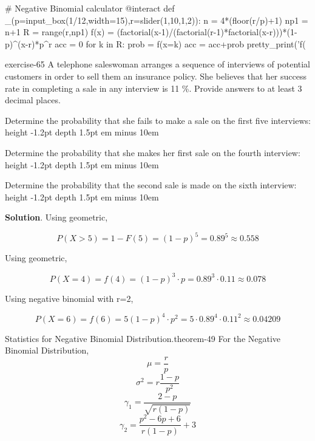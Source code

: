 \documentclass[10pt,]{book}
\newcommand{\fillin}[1]{\leavevmode\leaders\vrule height -1.2pt depth 1.5pt \hskip #1em minus #1em \null}
\numberwithin{equation}{section}
\newcommand{\gt}{>}
\begin{document}
\begin{sageinput}
# Negative Binomial calculator
@interact
def _(p=input_box(1/12,width=15),r=slider(1,10,1,2)):
    n = 4*(floor(r/p)+1)
    np1 = n+1
    R = range(r,np1)
    f(x) = (factorial(x-1)/(factorial(r-1)*factorial(x-r)))*(1-p)^(x-r)*p^r
    acc = 0
    for k in R:
        prob = f(x=k)
        acc = acc+prob
        pretty_print('f(%
\end{sageinput}
%
\begin{inlineexercise}{}{exercise-65}%
\hypertarget{p-993}{}%
A telephone saleswoman arranges a sequence of interviews of potential customers in order to sell them an insurance policy. She believes that her success rate in completing a sale in any interview is 11 \%. Provide answers to at least 3 decimal places.%
\par
\hypertarget{p-994}{}%
Determine the probability that she fails to make a sale on the first five interviews:   \fillin{10}%
\par
\hypertarget{p-995}{}%
Determine the probability that she makes her first sale on the fourth interview:  \fillin{10}%
\par
\hypertarget{p-996}{}%
Determine the probability that the second sale is made on the sixth interview:  \fillin{10}%
\par\smallskip%
\noindent\textbf{Solution}.\hypertarget{solution-29}{}\quad%
\hypertarget{p-997}{}%
Using geometric,%
\par
\hypertarget{p-998}{}%
%
\begin{equation*}
P(X \gt 5) = 1 - F(5) = (1-p)^5 = 0.89^5 \approx 0.558
\end{equation*}
%
\par
\hypertarget{p-999}{}%
Using geometric,%
\par
\hypertarget{p-1000}{}%
%
\begin{equation*}
P(X = 4) = f(4) = (1-p)^3 \cdot p = 0.89^3 \cdot 0.11 \approx 0.078
\end{equation*}
%
\par
\hypertarget{p-1001}{}%
Using negative binomial with r=2,%
\par
\hypertarget{p-1002}{}%
%
\begin{equation*}
P(X = 6) = f(6) = 5 (1-p)^4 \cdot p^2 = 5 \cdot 0.89^4 \cdot 0.11^2 \approx 0.04209
\end{equation*}
%
\end{inlineexercise}
\hypertarget{p-1003}{}%
\begin{theorem}{Statistics for Negative Binomial Distribution.}{}{theorem-49}%
\hypertarget{NegativeBinomialStatistics}{}%
For the Negative Binomial Distribution,%
\begin{equation*}
\mu = \frac{r}{p}
\end{equation*}
%
\begin{equation*}
\sigma^2 = r \frac{1-p}{p^2}
\end{equation*}
%
\begin{equation*}
\gamma_1 = \frac{2-p}{\sqrt{r(1-p)}}
\end{equation*}
%
\begin{equation*}
\gamma_2 = \frac{p^2-6p+6}{r(1-p)} + 3
\end{equation*}
%
\end{theorem}
\end{document}
